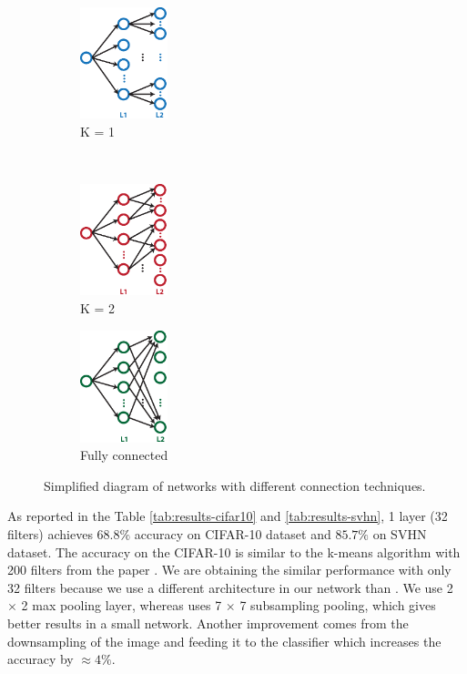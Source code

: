 \documentclass{article} %
\begin{document}
\begin{figure}
        \centering
         \label{fig-secondconnex}
        \begin{subfigure}[b]{0.3\textwidth}
                \centering
                \includegraphics[width=1.0in]{fig-diagram-fanin1.eps}
                \caption{K = 1}
                \label{fig-secondconnex-fanin1}
        \end{subfigure}%
        ~%
          \begin{subfigure}[b]{0.3\textwidth}
                \centering
                \includegraphics[width=1.0in]{fig-diagram-fanin2.eps}
                \caption{K = 2}
                \label{fig-secondconnex-fanin2}                
        \end{subfigure}%
        \begin{subfigure}[b]{0.3\textwidth}
                \centering
                \includegraphics[width=1.0in]{fig-diagram-faninall.eps}
                \caption{Fully connected}
                \label{fig-secondconnex-full}
        \end{subfigure}
        \caption{Simplified diagram of networks with different connection techniques.}
\end{figure}


As reported in the Table \ref{tab:results-cifar10} and \ref{tab:results-svhn}, 1 layer (32 filters) achieves $68.8\%$ accuracy on CIFAR-10 dataset and $85.7\%$ on SVHN dataset.
The accuracy on the CIFAR-10 is similar to the k-means algorithm with 200 filters from the paper \cite{coates_analysis_2011}.
We are obtaining the similar performance with only 32 filters because we use a different architecture in our network than \cite{coates_analysis_2011}.
We use 2 $\times$ 2 max pooling layer, whereas \cite{coates_analysis_2011} uses 7 $\times$ 7 subsampling pooling, which gives better results in a small network.
Another improvement comes from the downsampling of the image and feeding it to the classifier which increases the accuracy by  $\approx 4\%$. 
\end{document}

